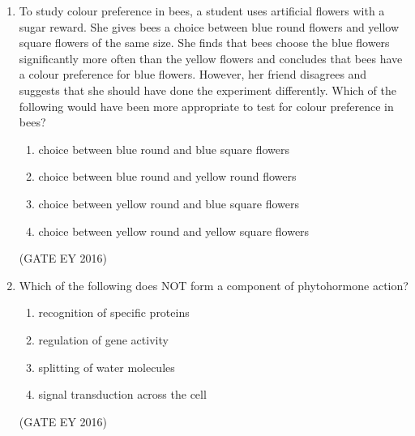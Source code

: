 \documentclass[journal]{IEEEtran}
\begin{document}
\begin{enumerate}
\item To study colour preference in bees, a student uses artificial flowers with a sugar reward. She gives bees a choice between blue round flowers and yellow square flowers of the same size. She finds that bees choose the blue flowers significantly more often than the yellow flowers and concludes that bees have a colour preference for blue flowers. However, her friend disagrees and suggests that she should have done the experiment differently. Which of the following would have been more appropriate to test for colour preference in bees?
\begin{enumerate}
    \item choice between blue round and blue square flowers
    \item choice between blue round and yellow round flowers
    \item choice between yellow round and blue square flowers
    \item choice between yellow round and yellow square flowers
\end{enumerate}
\hfill{(GATE EY 2016)}

\item Which of the following does NOT form a component of phytohormone action?
\begin{multicols}{2}
\begin{enumerate}
    \item recognition of specific proteins
    \item regulation of gene activity
    \item splitting of water molecules
    \item signal transduction across the cell
\end{enumerate}
\end{multicols}
\hfill{(GATE EY 2016)}


\end{enumerate}
\end{document}
